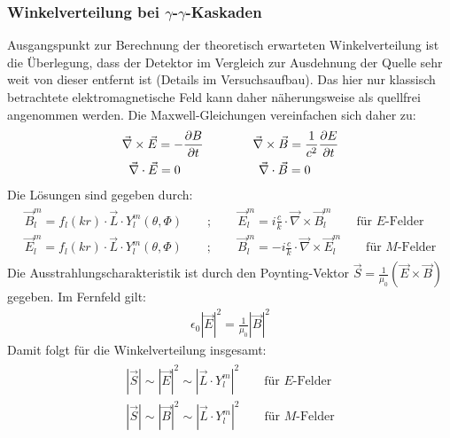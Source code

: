 \subsubsection{Winkelverteilung bei $\gamma$-$\gamma$-Kaskaden}

Ausgangspunkt zur Berechnung der theoretisch erwarteten Winkelverteilung ist die Überlegung, dass der Detektor im Vergleich zur Ausdehnung der Quelle sehr weit von dieser entfernt ist (Details im Versuchsaufbau). Das hier nur klassisch betrachtete elektromagnetische Feld kann daher näherungsweise als quellfrei angenommen werden. Die Maxwell-Gleichungen vereinfachen sich daher zu:
\begin{align}
	\begin{split}
		\vec{\nabla}\times\vec{E}=-\frac{\partial B}{\partial t}\qquad\qquad \vec{\nabla}\times\vec{B}=\frac{1}{c^2}\frac{\partial E}{\partial t}\\\vspace{0,2cm}
		\vec{\nabla}\cdot\vec{E}=0 \,\,\qquad\qquad\qquad\vec{\nabla}\cdot\vec{B}=0\qquad\;
	\end{split}
\end{align}
Die Lösungen sind gegeben durch:
\begin{align}
	\begin{split}
		\vec{B}^m_l= f_l(kr)\cdot\vec{L}\cdot Y^m_l(\theta,\Phi)\qquad ; \qquad \vec{E}^m_l = i \frac{c}{k} \cdot\vec{\nabla}\times \vec{B}^m_l\qquad\text{für $E$-Felder}\\
		\vec{E}^m_l= f_l(kr)\cdot\vec{L}\cdot Y^m_l(\theta,\Phi)\qquad ; \qquad \vec{B}^m_l = -i \frac{c}{k} \cdot\vec{\nabla}\times \vec{E}^m_l\qquad\text{für $M$-Felder}
	\end{split}
\end{align}
Die Ausstrahlungscharakteristik ist durch den Poynting-Vektor $\vec{S}=\frac{1}{\mu_0}\left( \vec{E}\times\vec{B}\right) $ gegeben. Im Fernfeld gilt:
\begin{align}
	\epsilon_0\left| \vec{E}\right| ^2=\frac{1}{\mu_0}\left| \vec{B}\right| ^2
\end{align}
Damit folgt für die Winkelverteilung insgesamt:
\begin{align}
\begin{split}
\left|\vec{S} \right| \sim \left| \vec{E}\right|^2 \sim \left| \vec{L}\cdot Y^m_l\right|^2\qquad\text{für $E$-Felder}\\
\left|\vec{S} \right| \sim \left| \vec{B}\right|^2 \sim \left| \vec{L}\cdot Y^m_l\right|^2\qquad\text{für $M$-Felder}
\end{split}
\end{align}
